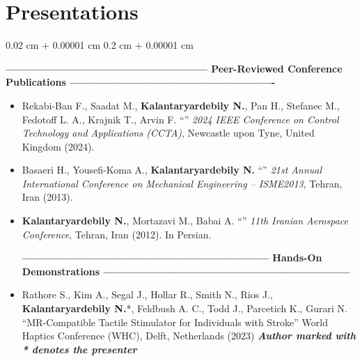\documentclass[10pt, letterpaper]{article}
\newenvironment{highlights}{
    \begin{itemize}[
        topsep=0.10 cm,
        parsep=0.10 cm,
        partopsep=0pt,
        itemsep=0pt,
        leftmargin=0.2 cm + 10pt
    ]
}{
    \end{itemize}
} %
\newenvironment{onecolentry}{
    \begin{adjustwidth}{
        0.02 cm + 0.00001 cm
    }{
        0.2 cm + 0.00001 cm
    }
}{
    \end{adjustwidth}
} %
\let\hrefWithoutArrow\href
\renewcommand{\href}[2]{\hrefWithoutArrow{#1}{#2}}
\begin{document}
\section{Presentations}
\begin{onecolentry}
\vspace{-.3em}
\hspace{1.5em} \textbf{------------------------------------------------------ Peer-Reviewed Conference Publications -------------------------------------------------------}
\begin{highlights}
    \item Rekabi-Ban F., Saadat M., \textbf{Kalantaryardebily N.}, Pan H., Stefanec M., Fedotoff L. A., Krajnik T., Arvin F. ``{\href{https://ieeexplore-ieee-org.ezproxy.lib.vt.edu/document/10666576}{\color{black}{Active Vibration Reduction for the RoboRoyale Autonomous Robotic Observation Mechanism}}}'' \textit{2024 IEEE Conference on Control Technology and Applications (CCTA)}, Newcastle upon Tyne, United Kingdom (2024).

    
    \item Basaeri H., Yousefi-Koma A., \textbf{Kalantaryardebily N.} ``{\color{black}{Design and Modeling of a Ducted Fan Manned Aerial Vehicle}}'' \textit{21st Annual International Conference on Mechanical Engineering – ISME2013}, Tehran, Iran (2013).
    
    \item \textbf{Kalantaryardebily N.}, Mortazavi M., Babai A. ``{\color{black}{Integrated Guidance and Control of UAVs Using Sliding Mode Control and Constrained Curves}}'' \textit{11th Iranian Aerospace Conference}, Tehran, Iran (2012). In Persian.

\textbf{------------------------------------------------------------------ Hands-On Demonstrations ------------------------------------------------------------------}
\item Rathore S., Kim A., Segal J., Hollar R., Smith N., Rios J., \textbf{Kalantaryardebily N.}*, Feldbush A. C., Todd J., Parcetich K., Gurari N.
``MR-Compatible Tactile Stimulator for Individuals with Stroke'' World Haptics Conference (WHC), Delft, Netherlands (2023) \textbf{\textit{Author marked with * denotes the presenter}}


\end{highlights}
\end{onecolentry}
\end{document}
